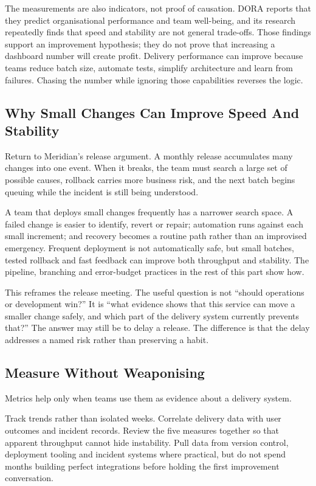 The measurements are also indicators, not proof of causation. DORA reports that they predict organisational performance and team well-being, and its research repeatedly finds that speed and stability are not general trade-offs. Those findings support an improvement hypothesis; they do not prove that increasing a dashboard number will create profit. Delivery performance can improve because teams reduce batch size, automate tests, simplify architecture and learn from failures. Chasing the number while ignoring those capabilities reverses the logic.



\subsection{Why Small Changes Can Improve Speed And Stability}


Return to Meridian's release argument. A monthly release accumulates many changes into one event. When it breaks, the team must search a large set of possible causes, rollback carries more business risk, and the next batch begins queuing while the incident is still being understood.


A team that deploys small changes frequently has a narrower search space. A failed change is easier to identify, revert or repair; automation runs against each small increment; and recovery becomes a routine path rather than an improvised emergency. Frequent deployment is not automatically safe, but small batches, tested rollback and fast feedback can improve both throughput and stability. The pipeline, branching and error-budget practices in the rest of this part show how.


This reframes the release meeting. The useful question is not ``should operations or development win?'' It is ``what evidence shows that this service can move a smaller change safely, and which part of the delivery system currently prevents that?'' The answer may still be to delay a release. The difference is that the delay addresses a named risk rather than preserving a habit.



\subsection{Measure Without Weaponising}


Metrics help only when teams use them as evidence about a delivery system.


Track trends rather than isolated weeks. Correlate delivery data with user outcomes and incident records. Review the five measures together so that apparent throughput cannot hide instability. Pull data from version control, deployment tooling and incident systems where practical, but do not spend months building perfect integrations before holding the first improvement conversation.


